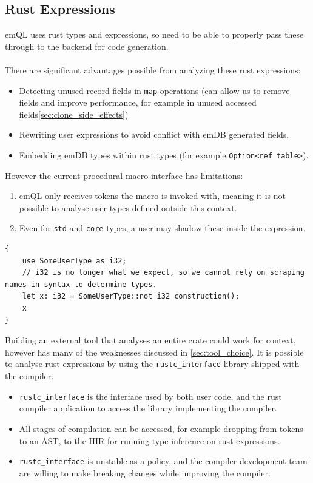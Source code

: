 \subsection{Rust Expressions}
emQL uses rust types and expressions, so need to be able to properly pass these through to the backend for code generation.
\\
\\ There are significant advantages possible from analyzing these rust expressions:
\begin{itemize}
    \setlength\itemsep{0em}
    \item Detecting unused record fields in \texttt{map} operations (can allow us to remove fields and improve performance, for example in unused accessed fields\ref{sec:clone_side_effects})
    \item Rewriting user expressions to avoid conflict with emDB generated fields.
    \item Embedding emDB types within rust types (for example \texttt{Option<ref table>}).
\end{itemize}
However the current procedural macro interface has limitations:
\begin{enumerate}
    \setlength\itemsep{0em}
    \item emQL only receives tokens the macro is invoked with, meaning it is not possible to analyse user types defined outside this context.
    \item {
          Even for \texttt{std} and \texttt{core} types, a user may shadow these inside the expression.
          }
\end{enumerate}
\noindent
\begin{verbatim}
{
    use SomeUserType as i32; 
    // i32 is no longer what we expect, so we cannot rely on scraping names in syntax to determine types.
    let x: i32 = SomeUserType::not_i32_construction();
    x
}
\end{verbatim}
Building an external tool that analyses an entire crate could work for context, however has many of the weaknesses discussed in \ref{sec:tool_choice}.
It is possible to analyse rust expressions by using the \texttt{rustc_interface} library shipped with the compiler.
\begin{itemize}
    \setlength\itemsep{0em}
    \item  \texttt{rustc_interface} is the interface used by both user code, and the rust compiler application to access the library implementing the compiler.
    \item All stages of compilation can be accessed, for example dropping from tokens to an AST, to the HIR for running type inference on rust expressions.
    \item \texttt{rustc_interface} is unstable as a policy, and the compiler development team are willing to make breaking changes while improving the compiler.
\end{itemize}
